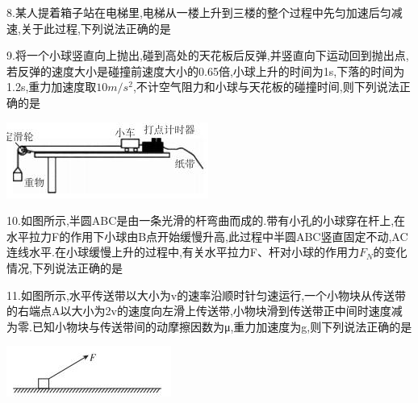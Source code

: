 \question[6] 8.某人提着箱子站在电梯里,电梯从一楼上升到三楼的整个过程中先匀加速后匀减速,关于此过程,下列说法正确的是
\begin{solution}{4cm}

\end{solution}



\question[6] 9.将一个小球竖直向上抛出,碰到高处的天花板后反弹,并竖直向下运动回到抛出点,若反弹的速度大小是碰撞前速度大小的0.65倍,小球上升的时间为1s,下落的时间为1.2s,重力加速度取$10m/s^2$,不计空气阻力和小球与天花板的碰撞时间,则下列说法正确的是
\begin{center}
\includegraphics[]{img/image9.jpeg}
\end{center}

\begin{solution}{4cm}

\end{solution}



\question[6] 10.如图所示,半圆ABC是由一条光滑的杆弯曲而成的.带有小孔的小球穿在杆上,在水平拉力F的作用下小球由B点开始缓慢升高,此过程中半圆ABC竖直固定不动,AC连线水平.在小球缓慢上升的过程中,有关水平拉力F、杆对小球的作用力$F_N$的变化情况,下列说法正确的是
\begin{solution}{4cm}

\end{solution}



\question[6] 11.如图所示,水平传送带以大小为v的速率沿顺时针匀速运行,一个小物块从传送带的右端点A以大小为2v的速度向左滑上传送带,小物块滑到传送带正中间时速度减为零.已知小物块与传送带间的动摩擦因数为μ,重力加速度为g,则下列说法正确的是
\begin{center}
\includegraphics[]{img/image11.jpeg}
\end{center}

